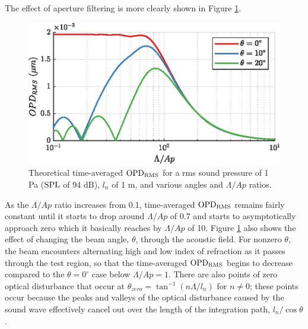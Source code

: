 The effect of aperture filtering is more clearly shown in Figure \ref{fig:03_planar_sample_calc_1}.
\begin{figure}
  \centering
  \includegraphics{../matlab/03_aero_optics_acoustics/planar_sample_calc_1.eps}
  \caption{Theoretical time-averaged $\operatorname{OPD_{RMS}}$ for a rms sound pressure of 1 Pa ($\operatorname{SPL}$ of 94 dB), $l_n$ of 1 m, and various angles and $\Lambda/Ap$ ratios.}
  \label{fig:03_planar_sample_calc_1}
\end{figure}
As the $\Lambda/Ap$ ratio increases from 0.1, time-averaged $\operatorname{OPD_{RMS}}$ remains fairly constant until it starts to drop around $\Lambda/Ap$ of 0.7 and starts to asymptotically approach zero which it basically reaches by $\Lambda/Ap$ of 10.
Figure \ref{fig:03_planar_sample_calc_1} also shows the effect of changing the beam angle, $\theta$, through the acoustic field.
For nonzero $\theta$, the beam encounters alternating high and low index of refraction as it passes through the test region, so that the time-averaged $\operatorname{OPD_{RMS}}$ begins to decrease compared to the $\theta = 0^\circ$ case below $\Lambda/Ap=1$.
There are also points of zero optical disturbance that occur at $\theta_{zero}=\tan^{-1}(n\Lambda/l_n)$ for $n\neq0$; these points occur because the peaks and valleys of the optical disturbance caused by the sound wave effectively cancel out over the length of the integration path, $l_n/\cos\theta$.


